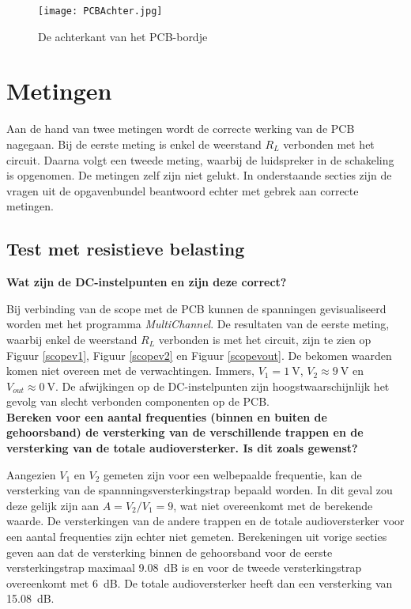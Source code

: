 \documentclass{report}
\begin{document}
\begin{figure}[H]
	\centering
	\texttt{[image: PCBAchter.jpg]}
	\caption{De achterkant van het PCB-bordje}
	\label{PCBAchter}
\end{figure}

\section{Metingen}

Aan de hand van twee metingen wordt de correcte werking van de PCB nagegaan. Bij de eerste meting is enkel de weerstand $R_L$ verbonden met het circuit. Daarna volgt een tweede meting, waarbij de luidspreker in de schakeling is opgenomen. De metingen zelf zijn niet gelukt. In onderstaande secties zijn de vragen uit de opgavenbundel beantwoord echter met gebrek aan correcte metingen.

\subsection{Test met resistieve belasting}
\label{testres}

\textbf{Wat zijn de DC-instelpunten en zijn deze correct?} 

\noindent Bij verbinding van de scope met de PCB kunnen de spanningen gevisualiseerd worden met het programma \textit{MultiChannel}. De resultaten van de eerste meting, waarbij enkel de weerstand $R_L$ verbonden is met het circuit, zijn te zien op Figuur \ref{scopev1}, Figuur \ref{scopev2} en Figuur \ref{scopevout}. De bekomen waarden komen niet overeen met de verwachtingen. Immers, $V_1 = \SI{1}{\volt}$, $V_2 \approx \SI{9}{\volt}$ en $V_{out} \approx \SI{0}{\volt}$. De afwijkingen op de DC-instelpunten zijn hoogstwaarschijnlijk het gevolg van slecht verbonden componenten op de PCB.\\

\noindent \textbf{Bereken voor een aantal frequenties (binnen en buiten de gehoorsband) de versterking
van de verschillende trappen en de versterking van de totale audioversterker. Is dit zoals
gewenst?}

\noindent Aangezien $V_1$ en $V_2$ gemeten zijn voor een welbepaalde frequentie, kan de versterking van de spannningsversterkingstrap bepaald worden. In dit geval zou deze gelijk zijn aan $A=V_2/V_1=9$, wat niet overeenkomt met de berekende waarde. De versterkingen van de andere trappen en de totale audioversterker voor een aantal frequenties zijn echter niet gemeten. Berekeningen uit vorige secties geven aan dat de versterking binnen de gehoorsband voor de eerste versterkingstrap maximaal \SI{9.08}{\deci\bel} is en voor de tweede versterkingstrap overeenkomt met \SI{6}{\deci\bel}. De totale audioversterker heeft dan een versterking van \SI{15.08}{\deci\bel}. \\
\end{document}
